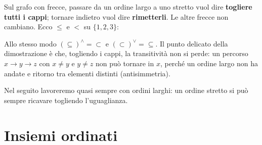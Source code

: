 \begin{spiegazione}
    Sul grafo con frecce, passare da un ordine largo a uno stretto vuol dire \textbf{togliere tutti i cappi}; tornare indietro vuol
    dire \textbf{rimetterli}. Le altre frecce non cambiano. Ecco $\leq$ e $<$ su $\{1, 2, 3\}$:
    \begin{center}
    \end{center}
    Allo stesso modo $(\subseteq)^\wedge = {\subset}$ e $(\subset)^\vee = {\subseteq}$. Il punto delicato della dimostrazione è che, togliendo i
    cappi, la transitività non si perde: un percorso $x \to y \to z$ con $x \neq y$ e $y \neq z$ non può tornare in $x$, perché un
    ordine largo non ha andate e ritorno tra elementi distinti (antisimmetria).
\end{spiegazione}

Nel seguito lavoreremo quasi sempre con ordini larghi: un ordine stretto si può sempre ricavare togliendo l'uguaglianza.

\section{Insiemi ordinati}\label{sec:insiemi-ordinati}

